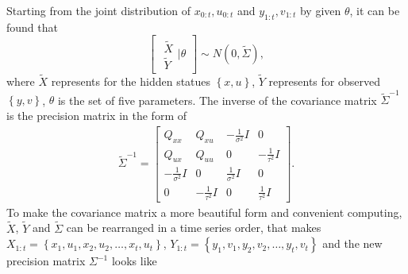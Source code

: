 Starting from the joint distribution of $x_{0:t},u_{0:t}$ and $y_{1:t},v_{1:t}$ by given $\theta$, it can be found that
\begin{equation}\label{jointmatrix}
\begin{bmatrix} \begin{matrix} \tilde{X}\\ \tilde{Y}  \end{matrix} \biggr\rvert \theta \end{bmatrix}
\sim N\left(0, \tilde{\Sigma} \right),
\end{equation}
where $\tilde{X}$ represents for the hidden statues $\left\lbrace x,u\right\rbrace$, $\tilde{Y}$ represents for observed $\left\lbrace y,v\right\rbrace$, $\theta$ is the set of five parameters.  The inverse of the covariance matrix $\tilde{\Sigma}^{-1}$ is the precision matrix in the form of
\begin{align*} \tilde{\Sigma}^{-1}=
\begin{bmatrix}
Q_{xx} & Q_{xu} & -\frac{1}{\sigma^2}I & 0\\
Q_{ux} & Q_{uu} & 0 &-\frac{1}{\tau^2}I \\
-\frac{1}{\sigma^2}I & 0 & \frac{1}{\sigma^2}I  & 0\\
 0  &  -\frac{1}{\tau^2}I  & 0 & \frac{1}{\tau^2}I 
\end{bmatrix}.
\end{align*}
To make the covariance matrix a more beautiful form and convenient computing, $\tilde{X}$, $\tilde{Y}$ and $\tilde{\Sigma}$ can be rearranged in a time series order, that makes $X_{1:t} = \left\lbrace x_1,u_1,x_2,u_2,\ldots, x_t, u_t \right\rbrace$, $Y_{1:t} = \left\lbrace y_1,v_1,y_2,v_2,\ldots, y_t, v_t \right\rbrace$ and the new precision matrix $\Sigma^{-1}$ looks like 
